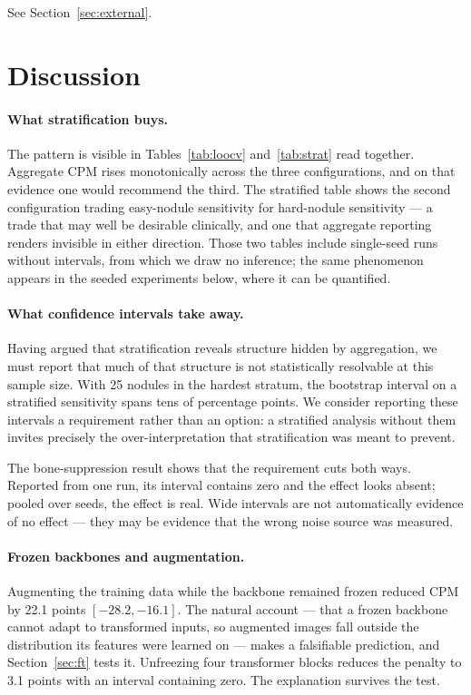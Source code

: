 \documentclass[11pt,a4paper]{article}
\begin{document}
See Section~\ref{sec:external}.

\section{Discussion}

\paragraph{What stratification buys.}
The pattern is visible in Tables~\ref{tab:loocv} and~\ref{tab:strat} read
together. Aggregate CPM rises monotonically across the three configurations, and
on that evidence one would recommend the third. The stratified table shows the
second configuration trading easy-nodule sensitivity for hard-nodule sensitivity
--- a trade that may well be desirable clinically, and one that aggregate
reporting renders invisible in either direction. Those two tables include single-seed runs without intervals, from which we
draw no inference; the same phenomenon appears in
the seeded experiments below, where it can be quantified.

\paragraph{What confidence intervals take away.}
Having argued that stratification reveals structure hidden by aggregation, we
must report that much of that structure is not statistically resolvable at this
sample size. With 25 nodules in the hardest stratum, the bootstrap interval on a
stratified sensitivity spans tens of percentage points. We consider reporting
these intervals a requirement rather than an option: a stratified analysis
without them invites precisely the over-interpretation that stratification was
meant to prevent.

The bone-suppression result shows that the requirement cuts both ways. Reported
from one run, its interval contains zero and the effect looks absent; pooled
over seeds, the effect is real. Wide intervals are not automatically evidence
of no effect --- they may be evidence that the wrong noise source was
measured.

\paragraph{Frozen backbones and augmentation.}
Augmenting the training data while the backbone remained frozen reduced CPM by
22.1 points $[-28.2, -16.1]$. The natural account --- that a frozen backbone
cannot adapt to transformed inputs, so augmented images fall outside the
distribution its features were learned on --- makes a falsifiable prediction, and
Section~\ref{sec:ft} tests it. Unfreezing four transformer blocks reduces the
penalty to 3.1 points with an interval containing zero. The explanation survives
the test.
\end{document}
